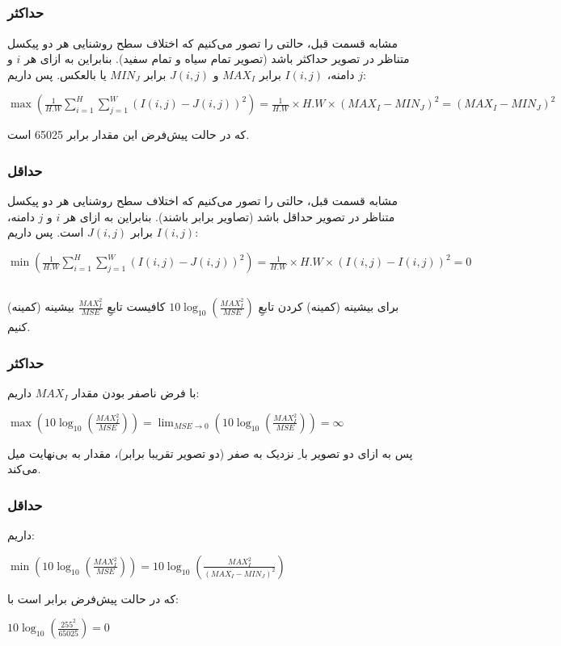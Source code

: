 \documentclass{article}
\begin{document}
\subsection{}
\subsubsection{حداکثر}
مشابه قسمت قبل، حالتی را تصور می‌کنیم که اختلاف سطح روشنایی هر دو پیکسل متناظر در تصویر حداکثر باشد (تصویر تمام سیاه و تمام سفید). بنابراین به ازای هر $i$ و $j$ دامنه، $I(i, j)$ برابر $MAX_{I}$ و $J(i, j)$ برابر $MIN_{J}$ یا بالعکس. پس داریم:
\newline
\begin{latin}
$
\max(\frac{1}{H.W}\sum_{i=1}^{H}\sum_{j=1}^{W} (I(i, j) - J(i, j))^{2})=\frac{1}{H.W}\times H.W\times (MAX_{I} - MIN_{J})^{2}=(MAX_{I} - MIN_{J})^{2}
$
\end{latin}
که در حالت پیش‌فرض این مقدار برابر 65025 است.
\subsubsection{حداقل}
مشابه قسمت قبل، حالتی را تصور می‌کنیم که اختلاف سطح روشنایی هر دو پیکسل متناظر در تصویر حداقل باشد (تصاویر برابر باشند). بنابراین به ازای هر $i$ و $j$ دامنه، $I(i, j)$ برابر $J(i, j)$ است. پس داریم:
\newline
\begin{latin}
$
\min(\frac{1}{H.W}\sum_{i=1}^{H}\sum_{j=1}^{W} (I(i, j) - J(i, j))^{2})=\frac{1}{H.W}\times H.W\times (I(i, j) - I(i, j))^{2}=0
$
\end{latin}


\subsection{}
برای بیشینه (کمینه) کردن تابعِ 
$
10\log_{10}(\frac{MAX_{I}^{2}}{MSE})
$
کافیست تابعِ
$
\frac{MAX_{I}^{2}}{MSE}
$
بیشینه (کمینه) کنیم.
\subsubsection{حداکثر}
با فرض ناصفر بودن مقدار $MAX_{I}$ داریم:
\newline
\begin{latin}
$
\max(10\log_{10}(\frac{MAX_{I}^{2}}{MSE}))=\lim_{MSE \to 0 } (10\log_{10}(\frac{MAX_{I}^{2}}{MSE}))=\infty
$
\end{latin}
پس به ازای دو تصویر با ِ نزدیک به صفر (دو تصویر تقریبا برابر)، مقدار  به بی‌نهایت میل می‌کند.
\subsubsection{حداقل}
داریم:
\newline
\begin{latin}
$
\min(10\log_{10}(\frac{MAX_{I}^{2}}{MSE}))=10\log_{10}(\frac{MAX_{I}^{2}}{(MAX_{I}-MIN_{J})^{2}})
$
\end{latin}
که در حالت پیش‌فرض برابر است با:
\newline
\begin{latin}
$
10\log_{10}(\frac{255^{2}}{65025})=0
$
\end{latin}
\end{document}
